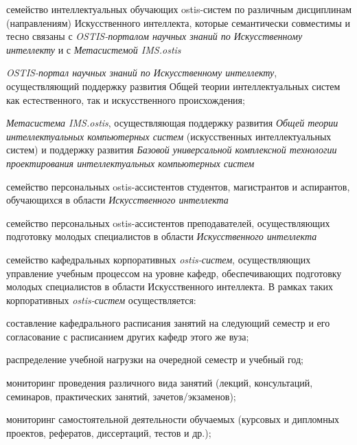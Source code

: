 \begin{scnsubstruct}
\begin{scnindent}
\begin{scnindent}
{\begin{scnitemize}
		            \item семейство интеллектуальных обучающих ostis-систем по различным дисциплинам (направлениям) Искусственного интеллекта, которые семантически совместимы и тесно связаны с \textit{OSTIS-порталом научных знаний по Искусственному интеллекту} и с \textit{Метасистемой IMS.ostis}
		            \item \textit{OSTIS-портал научных знаний по Искусственному интеллекту}, осуществляющий поддержку развития Общей теории интеллектуальных систем как естественного, так и искусственного происхождения;
		            \item \textit{Метасистема IMS.ostis}, осуществляющая поддержку развития \textit{Общей теории интеллектуальных компьютерных систем} (искусственных интеллектуальных систем) и поддержку развития \textit{Базовой универсальной комплексной технологии проектирования интеллектуальных компьютерных систем}
		            \item семейство персональных ostis-ассистентов студентов, магистрантов и аспирантов, обучающихся в области \textit{Искусственного интеллекта}
		            \item семейство персональных ostis-ассистентов преподавателей, осуществляющих подготовку молодых специалистов в области \textit{Искусственного интеллекта}
		            \item семейство кафедральных корпоративных \textit{ostis-систем}, осуществляющих управление учебным процессом на уровне кафедр, обеспечивающих подготовку молодых специалистов в области Искусственного интеллекта. В рамках таких корпоративных \textit{ostis-систем} осуществляется:
		            \begin{scnitemizeii}
		                \item составление кафедрального расписания занятий на следующий семестр и его согласование с расписанием других кафедр этого же вуза;
		                \item распределение учебной нагрузки на очередной семестр и учебный год;
		                \item мониторинг проведения различного вида занятий (лекций, консультаций, семинаров, практических занятий, зачетов/экзаменов);
		                \item мониторинг самостоятельной деятельности обучаемых (курсовых и дипломных проектов, рефератов, диссертаций, тестов и др.);

\end{scnitemizeii}
\end{scnitemize}}
\end{scnindent}
\end{scnindent}
\end{scnsubstruct}
